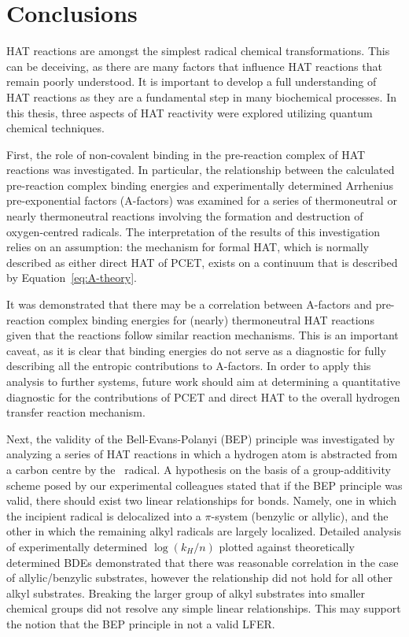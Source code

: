 
\chapter{Conclusions}

\begin{doublespace}

HAT reactions are amongst the simplest radical chemical transformations. This
can be deceiving, as there are many factors that influence HAT reactions that
remain poorly understood. It is important to develop a full understanding of HAT
reactions as they are a fundamental step in many biochemical processes. In this
thesis, three aspects of HAT reactivity were explored utilizing quantum chemical
techniques.

First, the role of non-covalent binding in the pre-reaction complex of HAT
reactions was investigated. In particular, the relationship between the
calculated pre-reaction complex binding energies and experimentally determined
Arrhenius pre-exponential factors (A-factors) was examined for a series of
thermoneutral or nearly thermoneutral reactions involving the formation and
destruction of oxygen-centred radicals. The interpretation of the results of
this investigation relies on an assumption: the mechanism for formal HAT, which
is normally described as either direct HAT of PCET, exists on a continuum that
is described by Equation~\ref{eq:A-theory}.

It was demonstrated that there may be a correlation between A-factors and
pre-reaction complex binding energies for (nearly) thermoneutral HAT reactions
given that the reactions follow similar reaction mechanisms. This is an
important caveat, as it is clear that binding energies do not serve as a
diagnostic for fully describing all the entropic contributions to A-factors. In
order to apply this analysis to further systems, future work should aim at
determining a quantitative diagnostic for the contributions of PCET and direct
HAT to the overall hydrogen transfer reaction mechanism.

Next, the validity of the Bell-Evans-Polanyi (BEP) principle was investigated by
analyzing a series of HAT reactions in which a hydrogen atom is abstracted from
a carbon centre by the \cumo\ radical. A hypothesis on the basis of a
group-additivity scheme posed by our experimental colleagues stated that if the
BEP principle was valid, there should exist two linear relationships for
 bonds. Namely, one in which the incipient radical is delocalized into a
$\pi$-system (benzylic or allylic), and the other in which the remaining alkyl
radicals are largely localized. Detailed analysis of experimentally determined
$\log(k_H/n)$ plotted against theoretically determined  BDEs
demonstrated that there was reasonable correlation in the case of
allylic/benzylic substrates, however the relationship did not hold for all other
alkyl substrates. Breaking the larger group of alkyl substrates into smaller
chemical groups did not resolve any simple linear relationships. This may
support the notion that the BEP principle in not a valid LFER.


\end{doublespace}
